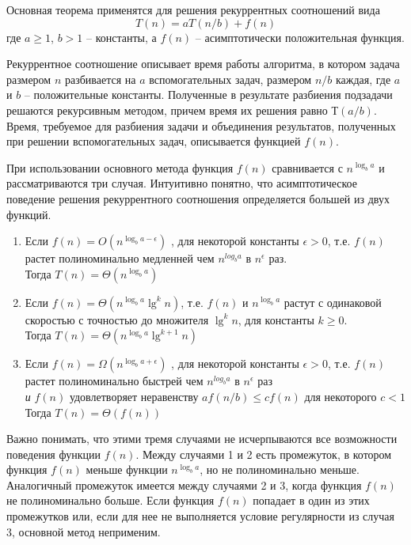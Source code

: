 \documentclass[a4paper,11pt]{article}
\begin{document}
Основная теорема применятся для решения рекуррентных соотношений вида
\begin{equation*}
  T(n) = aT(n/b) + f(n)
\end{equation*}
где $a \geqslant 1$, $b > 1$ -- константы, а $f(n)$ -- асимптотически
положительная функция.

Рекуррентное соотношение описывает время работы алгоритма, в котором задача
размером $n$ разбивается на $a$ вспомогательных задач, размером $n/b$ каждая,
где $a$ и $b$ -- положительные константы. Полученные в результате разбиения
подзадачи решаются рекурсивным методом, причем время их решения равно $Т(a/b)$.
Время, требуемое для разбиения задачи и объединения результатов, полученных при
решении вспомогательных задач, описывается функцией $f(n)$.

При использовании основного метода функция $f(n)$ сравнивается с
$n^{\log_b a}$ и рассматриваются три случая. Интуитивно понятно, что
асимптотическое поведение решения рекуррентного соотношения определяется
большей из двух функций.

\begin{enumerate}
\item Если $f(n) = O(n^{\log_{b}{a - \epsilon}})$ , для некоторой константы
  $\epsilon > 0$, т.е. $f(n)$ растет полиноминально медленней чем $n^{log_b a}$
  в $n^\epsilon$ раз.\\Тогда $T(n) = \Theta(n^{\log_b a})$
\item Если $f(n) = \Theta(n^{\log_b a}\lg^k n)$, т.е. $f(n)$ и $n^{\log_b a}$
  растут с одинаковой скоростью с точностью до множителя $\lg^k n$, для
  константы $k \geqslant 0$.\\ Тогда $T(n) = \Theta(n^{\log_b a}\lg^{k+1} n)$
\item Если $f(n) = \Omega(n^{\log_{b}{a + \epsilon}})$ , для некоторой
  константы $\epsilon > 0$, т.е. $f(n)$ растет полиноминально быстрей чем
  $n^{log_b a}$ в $n^\epsilon$ раз \\
  \emph{и} $f(n)$ удовлетворяет неравенству $a f(n/b) \leqslant c f(n)$ для
  некоторого $c < 1$\\Тогда $T(n) = \Theta(f(n))$
\end{enumerate}

Важно понимать, что этими тремя случаями не исчерпываются все возможности
поведения функции $f(n)$. Между случаями 1 и 2 есть промежуток, в котором 
функция $f(n)$ меньше функции $n^{\log_b a}$, но не полиноминально меньше.
Аналогичный промежуток имеется между случаями 2 и 3, когда функция $f(n)$ не
полиноминально больше. Если функция $f(n)$ попадает в один из этих промежутков
или, если для нее не выполняется условие регулярности из случая 3, основной
метод неприменим.
\end{document}
